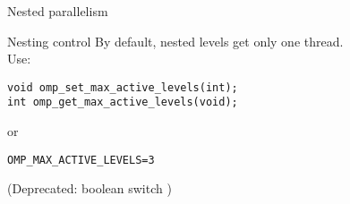 \begin{numberedframe}{Nested parallelism}
  
\end{numberedframe}

\begin{numberedframe}{Nesting control}
  By default, nested levels get only one thread.\\
  Use:
\begin{lstlisting}
void omp_set_max_active_levels(int);
int omp_get_max_active_levels(void);
\end{lstlisting}
or 
\begin{verbatim}
OMP_MAX_ACTIVE_LEVELS=3
\end{verbatim}
(Deprecated: boolean switch )
\end{numberedframe}

\endinput

\begin{numberedframe}{}
\begin{lstlisting}
\end{lstlisting}
\begin{itemize}
\item
\end{itemize}
\end{numberedframe}

